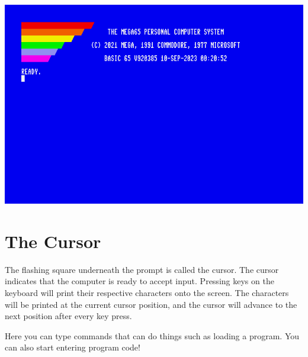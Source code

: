 \begin{center}
  \includegraphics[width=0.7\linewidth]{images/img011_final_boot_06.png}
\end{center}

\section{The Cursor}

The flashing square underneath the  prompt is called the cursor. The cursor indicates that the computer is ready to accept input. Pressing keys on the keyboard will print their respective characters onto the screen. The characters will be printed at the current cursor position, and the cursor will advance to the next position after every key press.

Here you can type commands that can do things such as loading a program. You can also start entering program code!
